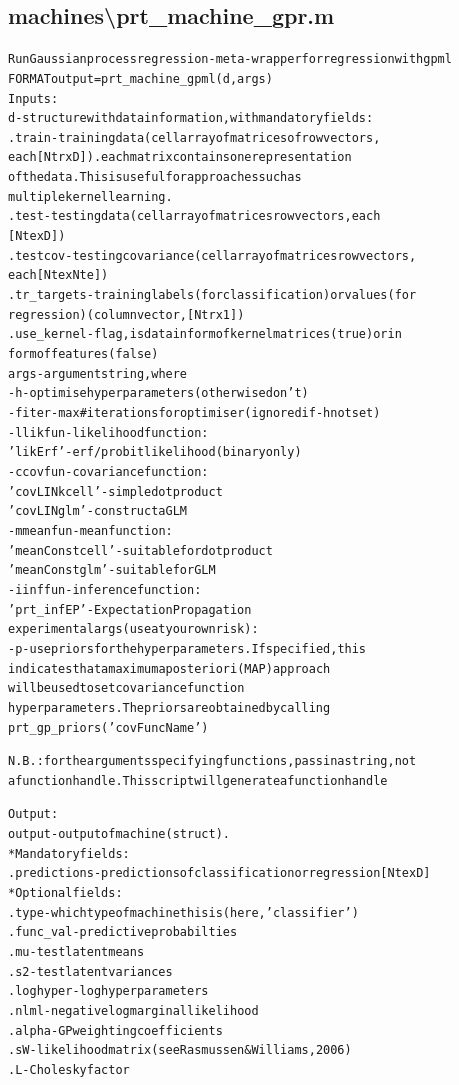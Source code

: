 \subsection{machines\textbackslash prt\_machine\_gpr.m}
\begin{alltt}

 Run Gaussian process regression - meta-wrapper for regression with gpml  
 FORMAT output = prt\_machine\_gpml(d,args)
 Inputs:
   d         - structure with data information, with mandatory fields:
     .train      - training data (cell array of matrices of row vectors,
                   each [Ntr x D]). each matrix contains one representation
                   of the data. This is useful for approaches such as
                   multiple kernel learning.
     .test       - testing data  (cell array of matrices row vectors, each
                   [Nte x D])
     .testcov    - testing covariance (cell array of matrices row vectors,
                   each [Nte x Nte])
     .tr\_targets - training labels (for classification) or values (for
                   regression) (column vector, [Ntr x 1])
     .use\_kernel - flag, is data in form of kernel matrices (true) or in 
                   form of features (false)
    args     - argument string, where
       -h         - optimise hyperparameters (otherwise don't)
       -f iter    - max \# iterations for optimiser (ignored if -h not set)
       -l likfun  - likelihood function:
                       'likErf' - erf/probit likelihood (binary only)
       -c covfun  - covariance function:
                       'covLINkcell' - simple dot product
                       'covLINglm'   - construct a GLM
       -m meanfun - mean function:
                       'meanConstcell' - suitable for dot product
                       'meanConstglm'  - suitable for GLM
       -i inffun  - inference function:
                       'prt\_infEP' - Expectation Propagation
    experimental args (use at your own risk):
       -p         - use priors for the hyperparameters. If specified, this
                    indicates that a maximum a posteriori (MAP) approach
                    will be used to set covariance function
                    hyperparameters. The priors are obtained by calling
                    prt\_gp\_priors('covFuncName')
 
       N.B.: for the arguments specifying functions, pass in a string, not
       a function handle. This script will generate a function handle
 
 Output:
    output  - output of machine (struct).
     * Mandatory fields:
      .predictions - predictions of classification or regression [Nte x D]
     * Optional fields:
      .type     - which type of machine this is (here, 'classifier')
      .func\_val - predictive probabilties
      .mu       - test latent means
      .s2       - test latent variances
      .loghyper - log hyperparameters
      .nlml     - negative log marginal likelihood
      .alpha    - GP weighting coefficients
      .sW       - likelihood matrix (see Rasmussen \& Williams, 2006)
      .L        - Cholesky factor
\end{alltt}


